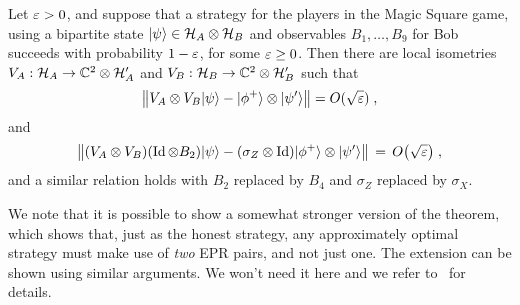 \begin{theorem}
\label{theorem-rigid-ms}
Let $\varepsilon>0$, and suppose that a strategy for the players  in the Magic Square game, using  a bipartite state $|\psi\rangle\in\mathcal{H}_A\otimes \mathcal{H}_B$ and observables $B_1,\ldots,B_9$ for Bob succeeds with probability $1-\varepsilon$, for some $\varepsilon \geq 0$. Then there are local isometries $V_A:\mathcal{H}_A\to \mathbb{C}^2 \otimes \mathcal{H}_A'$ and $V_B:\mathcal{H}_B\to \mathbb{C}^2 \otimes \mathcal{H}_B'$ such that 
\begin{equation}
\label{equation-chsh-state}
\big\| V_A \otimes V_B |\psi\rangle - |\phi^+\rangle \otimes |\psi'\rangle \big\| = O(\sqrt{\varepsilon}) \;,
\end{equation}
and 
\begin{equation}
\label{equation-chsh-alice}
\big\|( V_A \otimes V_B)( \mathop{\rm Id}\nolimits \otimes B_2 )|\psi\rangle - (\sigma_Z \otimes \mathop{\rm Id}\nolimits) |\phi^+\rangle \otimes |\psi'\rangle \big\| \,=\, O\big(\sqrt{\varepsilon}\big)\;,
\end{equation}
and a similar relation holds with $B_2$ replaced by $B_4$ and $\sigma_Z$ replaced by $\sigma_X$. 
\end{theorem}

We note that it is possible to show a somewhat stronger version of the theorem, which shows that, just as the honest strategy, any approximately optimal strategy must make use of \emph{two} EPR pairs, and not just one. The extension can be shown using similar arguments. We won't need it here and we refer to~\cite{coladangelo2017robust} for details.  

